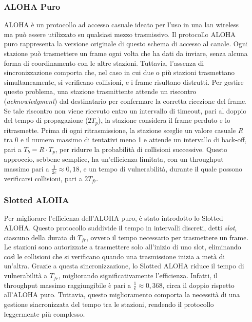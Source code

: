 \documentclass[12pt]{report}
\begin{document}
\subsubsection{ALOHA Puro}
ALOHA è un protocollo ad accesso casuale ideato per l'uso in una lan wireless ma può essere utilizzato su qualsiasi mezzo trasmissivo. Il protocollo ALOHA puro rappresenta la versione originale di questo schema di accesso al canale. Ogni stazione può trasmettere un frame ogni volta che ha dati da inviare, senza alcuna forma di coordinamento con le altre stazioni. Tuttavia, l'assenza di sincronizzazione comporta che, nel caso in cui due o più stazioni trasmettano simultaneamente, si verificano collisioni, e i frame risultano distrutti. Per gestire questo problema, una stazione trasmittente attende un riscontro (\textit{acknowledgment}) dal destinatario per confermare la corretta ricezione del frame. Se tale riscontro non viene ricevuto entro un intervallo di timeout, pari al doppio del tempo di propagazione (\(2T_p\)), la stazione considera il frame perduto e lo ritrasmette. Prima di ogni ritrasmissione, la stazione sceglie un valore casuale \(R\) tra 0 e il numero massimo di tentativi meno 1 e attende un intervallo di back-off, pari a \(T_b = R \cdot T_p\), per ridurre la probabilità di collisioni successive. Questo approccio, sebbene semplice, ha un'efficienza limitata, con un throughput massimo pari a \(\frac{1}{2e} \approx 0,18\), e un tempo di vulnerabilità, durante il quale possono verificarsi collisioni, pari a \(2T_{fr}\).

\subsubsection{Slotted ALOHA}
Per migliorare l'efficienza dell'ALOHA puro, è stato introdotto lo Slotted ALOHA. Questo protocollo suddivide il tempo in intervalli discreti, detti \textit{slot}, ciascuno della durata di \(T_{fr}\), ovvero il tempo necessario per trasmettere un frame. Le stazioni sono autorizzate a trasmettere solo all'inizio di uno slot, eliminando così le collisioni che si verificano quando una trasmissione inizia a metà di un'altra. Grazie a questa sincronizzazione, lo Slotted ALOHA riduce il tempo di vulnerabilità a \(T_{fr}\), migliorando significativamente l'efficienza. Infatti, il throughput massimo raggiungibile è pari a \(\frac{1}{e} \approx 0,368\), circa il doppio rispetto all'ALOHA puro. Tuttavia, questo miglioramento comporta la necessità di una gestione sincronizzata del tempo tra le stazioni, rendendo il protocollo leggermente più complesso.
\end{document}
